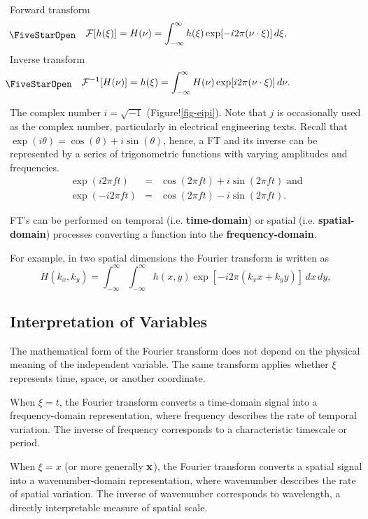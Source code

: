 Forward transform
\begin{equation}
    \workeq
    \mcal{F} [h(\xi)] = H(\nu) = 
    \int_{-\infty}^{\infty} h(\xi)
    \exp [ -i 2 \pi (\nu \cdot \xi) ]\, d\xi,
\end{equation}
Inverse transform
\begin{equation}
    \workeq
    \mcal{F}^{-1} [H(\nu)] = h(\xi) = 
    \int_{-\infty}^{\infty} H(\nu)
    \exp [ i 2 \pi (\nu \cdot \xi) ]\, d\nu.
\end{equation}

The complex number $i = \sqrt{-1}$ (Figure!\ref{fig-eipi}).  Note that $j$ is occasionally used as the complex number, particularly in electrical engineering texts.  Recall that $\exp( i \theta ) = \cos(\theta) + i \sin(\theta)$, hence, a FT and its inverse can be represented by a series of trigonometric functions with varying amplitudes and frequencies.
\begin{eqnarray*}
    \exp( i 2 \pi f t ) & = &\cos(2 \pi f t) + i \sin(2 \pi f t) \mbox{ and} \\
    \exp( - i 2 \pi f t ) & = &\cos(2 \pi f t) - i \sin(2 \pi f t).
\end{eqnarray*}

FT's can be performed on temporal (i.e.  {\bf time-domain}) or spatial (i.e.  {\bf spatial-domain}) processes converting a function into the {\bf frequency-domain}.

For example, in two spatial dimensions the Fourier transform is written as
\[
    H(k_x,k_y) = \int_{-\infty}^{\infty}\int_{-\infty}^{\infty}
    h(x,y) \exp [ -i 2 \pi (k_{x}x + k_{y} y) ]\,
    dx\, dy,
\]

\subsection{Interpretation of Variables}

The mathematical form of the Fourier transform does not depend on the physical meaning of the independent variable. The same transform applies whether $\xi$ represents time, space, or another coordinate.

When $\xi = t$, the Fourier transform converts a time-domain signal into a frequency-domain representation, where frequency describes the rate of temporal variation. The inverse of frequency corresponds to a characteristic timescale or period.

When $\xi = x$ (or more generally $\vb{x}$), the Fourier transform converts a spatial signal into a wavenumber-domain representation, where wavenumber describes the rate of spatial variation. The inverse of wavenumber corresponds to wavelength, a directly interpretable measure of spatial scale.

